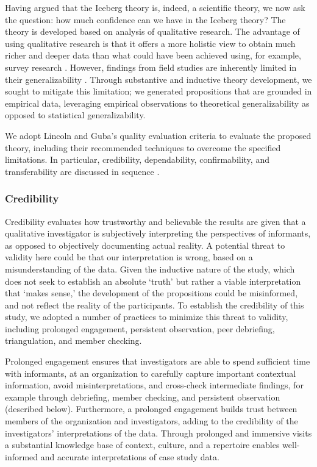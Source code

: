 \documentclass[smallextended]{svjour3}       %
\begin{document}
Having argued that the Iceberg theory is, indeed, a scientific theory, we now ask the question: how much confidence can we have in the Iceberg theory?
%
The theory is developed based on analysis of qualitative research. 
The advantage of using qualitative research is that it offers a more holistic view to obtain much richer and deeper data than what could have been achieved using, for example, survey research \citep{marshall2014designing}. However, findings from field studies are inherently limited in their generalizability \citep{stol2018abc}. Through substantive and inductive theory development, we sought to mitigate this limitation; we generated propositions that are grounded in empirical data, leveraging empirical observations to theoretical generalizability as opposed to statistical generalizability. 



We adopt Lincoln and Guba's quality evaluation criteria to evaluate the proposed theory, including their recommended techniques to overcome the specified limitations.
In particular, credibility, dependability, confirmability, and transferability are discussed in sequence \citep{lincoln1985naturalistic, guba1994competing}.


\subsubsection{Credibility}

Credibility evaluates how trustworthy and believable the results are given that a qualitative investigator is subjectively interpreting the perspectives of informants, as opposed to objectively documenting actual reality.
A potential threat to validity here could be that our interpretation is wrong, based on a misunderstanding of the data. Given the inductive nature of the study, which does not seek to establish an absolute `truth' but rather a viable interpretation that `makes sense,' the development of the propositions could be misinformed, and not reflect the reality of the participants. 
To establish the credibility of this study, we adopted a number of practices to minimize this threat to validity, including prolonged engagement, persistent observation, peer debriefing, triangulation, and member checking.

{Prolonged engagement} ensures that investigators are able to spend sufficient time with informants, at an organization to carefully capture important contextual information, avoid misinterpretations, and cross-check intermediate findings, for example through debriefing, member checking, and persistent observation (described below). 
Furthermore, a prolonged engagement builds trust between members of the organization and investigators, adding to the credibility of the investigators' interpretations of the data.
Through prolonged and immersive visits a substantial knowledge base of context, culture, and a repertoire enables well-informed and accurate interpretations of case study data.
\end{document}
